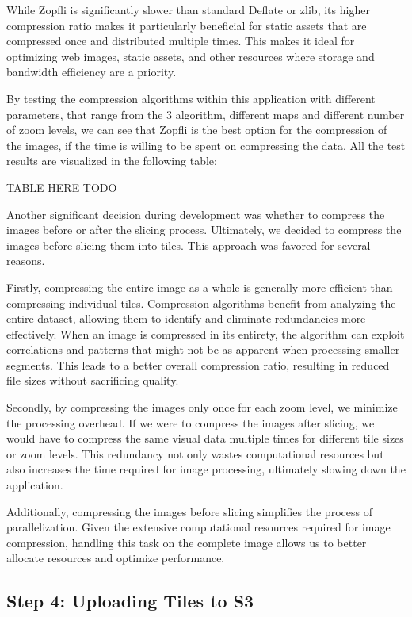 While Zopfli is significantly slower than standard Deflate or zlib, its higher compression ratio makes it particularly beneficial for static assets that are compressed once and distributed multiple times. This makes it ideal for optimizing web images, static assets, and other resources where storage and bandwidth efficiency are a priority.

By testing the compression algorithms within this application with different parameters, that range from the 3 algorithm, different maps and different number of zoom levels, we can see that Zopfli is the best option for the compression of the images, if the time is willing to be spent on compressing the data. All the test results are visualized in the following table:


TABLE HERE TODO

Another significant decision during development was whether to compress the images before or after the slicing process. Ultimately, we decided to compress the images before slicing them into tiles. This approach was favored for several reasons.

Firstly, compressing the entire image as a whole is generally more efficient than compressing individual tiles. Compression algorithms benefit from analyzing the entire dataset, allowing them to identify and eliminate redundancies more effectively. When an image is compressed in its entirety, the algorithm can exploit correlations and patterns that might not be as apparent when processing smaller segments. This leads to a better overall compression ratio, resulting in reduced file sizes without sacrificing quality.

Secondly, by compressing the images only once for each zoom level, we minimize the processing overhead. If we were to compress the images after slicing, we would have to compress the same visual data multiple times for different tile sizes or zoom levels. This redundancy not only wastes computational resources but also increases the time required for image processing, ultimately slowing down the application.

Additionally, compressing the images before slicing simplifies the process of parallelization. Given the extensive computational resources required for image compression, handling this task on the complete image allows us to better allocate resources and optimize performance.




\subsection{Step 4: Uploading Tiles to S3}

